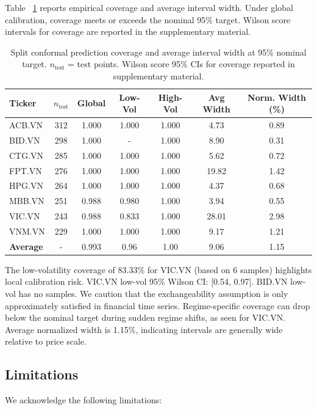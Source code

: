 \documentclass[runningheads]{llncs}
\begin{document}
Table~
\ref{tabconformal} reports empirical coverage and average interval width. Under global calibration, coverage meets or exceeds the nominal 95\% target. Wilson score intervals for coverage are reported in the supplementary material.

\begin{table}[htbp]
\centering
\caption{Split conformal prediction coverage and average interval width at 95\% nominal target. $n_{\text{test}}$ = test points. Wilson score 95\% CIs for coverage reported in supplementary material.}
\label{tabconformal}
\begin{tabular}{lcccccc}
\toprule
Ticker & $n_{\text{test}}$ & Global & Low-Vol & High-Vol & Avg Width & Norm. Width (\%) \\
\midrule
ACB.VN & 312 & 1.000 & 1.000 & 1.000 & 4.73 & 0.89 \\
BID.VN & 298 & 1.000 & - & 1.000 & 8.90 & 0.31 \\
CTG.VN & 285 & 1.000 & 1.000 & 1.000 & 5.62 & 0.72 \\
FPT.VN & 276 & 1.000 & 1.000 & 1.000 & 19.82 & 1.42 \\
HPG.VN & 264 & 1.000 & 1.000 & 1.000 & 4.37 & 0.68 \\
MBB.VN & 251 & 0.988 & 0.980 & 1.000 & 3.94 & 0.55 \\
VIC.VN & 243 & 0.988 & 0.833 & 1.000 & 28.01 & 2.98 \\
VNM.VN & 229 & 1.000 & 1.000 & 1.000 & 9.17 & 1.21 \\
\midrule
\textbf{Average} & - & 0.993 & 0.96 & 1.00 & 9.06 & 1.15 \\
\bottomrule
\end{tabular}
\end{table}

The low-volatility coverage of 83.33\% for VIC.VN (based on 6 samples) highlights local calibration risk. VIC.VN low-vol 95\% Wilson CI: [0.54, 0.97]. BID.VN low-vol has no samples. We caution that the exchangeability assumption is only approximately satisfied in financial time series. Regime-specific coverage can drop below the nominal target during sudden regime shifts, as seen for VIC.VN. Average normalized width is 1.15\%, indicating intervals are generally wide relative to price scale.

\subsection{Limitations}
\label{seclimitations}

We acknowledge the following limitations:
\end{document}

